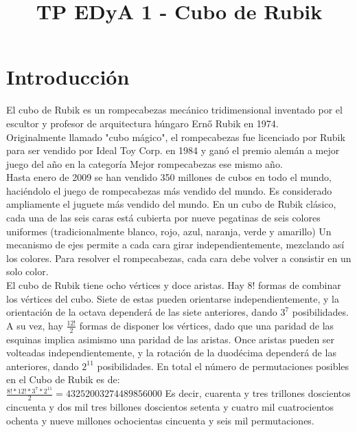 \documentclass[11pt,twoside,a4paper]{article}
\begin{document}
\title{TP EDyA 1 - Cubo de Rubik}

\maketitle


\section{Introducción}

El cubo de Rubik es un rompecabezas mecánico tridimensional inventado por el escultor y profesor de arquitectura húngaro Ernő Rubik en 1974.\\ Originalmente llamado "cubo mágico", el rompecabezas fue licenciado por Rubik para ser vendido por Ideal Toy Corp. en 1984 y ganó el premio alemán a mejor juego del año en la categoría Mejor rompecabezas ese mismo año.\\ Hasta enero de 2009 se han vendido 350 millones de cubos en todo el mundo, haciéndolo el juego de rompecabezas más vendido del mundo. Es considerado ampliamente el juguete más vendido del mundo.
En un cubo de Rubik clásico, cada una de las seis caras está cubierta por nueve pegatinas de seis colores uniformes (tradicionalmente blanco, rojo, azul, naranja, verde y amarillo) Un mecanismo de ejes permite a cada cara girar independientemente, mezclando así los colores. Para resolver el rompecabezas, cada cara debe volver a consistir en un solo color.\\
El cubo de Rubik tiene ocho vértices y doce aristas. Hay $8!$ formas de combinar los vértices del cubo. Siete de estas pueden orientarse independientemente, y la orientación de la octava dependerá de las siete anteriores, dando  $3^7$ posibilidades. A su vez, hay $\frac{12!}{2}$ formas de disponer los vértices, dado que una paridad de las esquinas implica asimismo una paridad de las aristas. Once aristas pueden ser volteadas independientemente, y la rotación de la duodécima dependerá de las anteriores, dando $2^11$ posibilidades. En total el número de permutaciones posibles en el Cubo de Rubik es de:\\
 $\frac{8!*12!*3^7*2^11}{2} = 43 252 003 274 489 856 000$
Es decir, cuarenta y tres trillones doscientos cincuenta y dos mil tres billones doscientos setenta y cuatro mil cuatrocientos ochenta y nueve millones ochocientas cincuenta y seis mil permutaciones.\\
\end{document}
